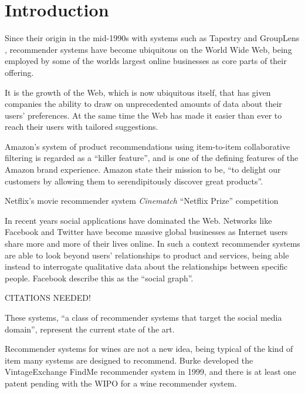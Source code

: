 \iffalse 
Chapter 1: Introduction - the topic, the background, why the topic is relevant or of interest to you, what you hoped to achieve, the aims and objectives of the project.  
\fi

\section{Introduction}


Since their origin in the mid-1990s with systems such as Tapestry \cite{Goldberg92} and GroupLens \cite{Resnick94}, recommender systems have become ubiquitous on the World Wide Web, being employed by some of the worlds largest online businesses as core parts of their offering.

It is the growth of the Web, which is now ubiquitous itself, that has given companies the ability to draw on unprecedented amounts of data about their users' preferences. At the same time the Web has made it easier than ever to reach their users with tailored suggestions.

Amazon's system of product recommendations using item-to-item collaborative filtering is regarded as a ``killer feature''\cite{Fortune12}, and is one of the defining features of the Amazon brand experience. Amazon state their mission to be, ``to delight our customers by allowing them to serendipitously discover great products''\cite{Fortune12}.

Netflix's movie recommender system \emph{Cinematch}  ``Netflix Prize'' competition 



In recent years social applications have dominated the Web. Networks like Facebook and Twitter have become massive global businesses as Internet users share more and more of their lives online. In such a context recommender systems are able to look beyond users' relationships to product and services, being able instead to interrogate qualitative data about the relationships between specific people. Facebook describe this as the ``social graph''.

CITATIONS NEEDED!

These systems, ``a class of recommender systems that target the social media domain''\cite{Guy11}, represent the current state of the art. 


Recommender systems for wines are not a new idea, being typical of the kind of item many systems are designed to recommend. Burke developed the VintageExchange FindMe recommender system in 1999\cite{Burke99}, and there is at least one patent pending with the WIPO for a wine recommender system\cite{WIPO12}.

